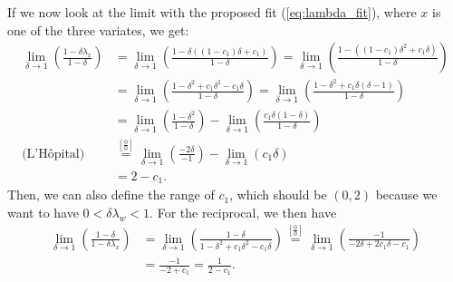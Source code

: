 \documentclass[10pt]{beamer}
\numberwithin{equation}{section}
\begin{document}
\begin{frame}[allowframebreaks]
        If we now look at the limit with the proposed fit (\eqref{eq:lambda_fit}),
        where $x$ is one of the three variates, we get:
        \begin{align}
            \lim_{\delta \to 1} \left(\frac{1 - \delta\lambda_x}{1 - \delta}\right)
            &= \lim_{\delta \to 1} \left(\frac{1 - \delta((1 - c_1) \delta + c_1)}{1 - \delta}\right)
            = \lim_{\delta \to 1} \left(\frac{1 - ((1 - c_1) \delta^2 + c_1\delta)}{1 - \delta}\right) \\
            &= \lim_{\delta \to 1} \left(\frac{1 - \delta^2 + c_1\delta^2 - c_1\delta}{1 - \delta}\right)
            = \lim_{\delta \to 1} \left(\frac{1 - \delta^2 + c_1\delta(\delta - 1)}{1 - \delta}\right) \\
            &= \lim_{\delta \to 1} \left(\frac{1 - \delta^2}{1 - \delta}\right)
            - \lim_{\delta \to 1} \left(\frac{c_1\delta(1 - \delta)}{1 - \delta}\right) \\
            \text{(L'Hôpital)}
            &\overset{\left[\frac{0}{0}\right]}{=} \lim_{\delta \to 1} \left(\frac{-2\delta}{-1}\right)
            - \lim_{\delta \to 1} \left(c_1\delta\right) \\
            &= 2 - c_1.
        \end{align}
        Then, we can also define the range of $c_1$,
        which should be $(0, 2)$ because we want to have $0 < \delta\lambda_w < 1$.
        For the reciprocal, we then have
        \begin{align}
            \lim_{\delta \to 1} \left(\frac{1 - \delta}{1 - \delta\lambda_x}\right)
            &= \lim_{\delta \to 1} \left(\frac{1 - \delta}{1 - \delta^2 + c_1\delta^2 - c_1\delta}\right)
            \overset{\left[\frac{0}{0}\right]}{=} \lim_{\delta \to 1} \left(\frac{-1}{- 2\delta + 2c_1\delta - c_1}\right) \\
            &= \frac{-1}{-2 + c_1} = \frac{1}{2 - c_1}.
        \end{align}
    \end{frame}
\end{document}
